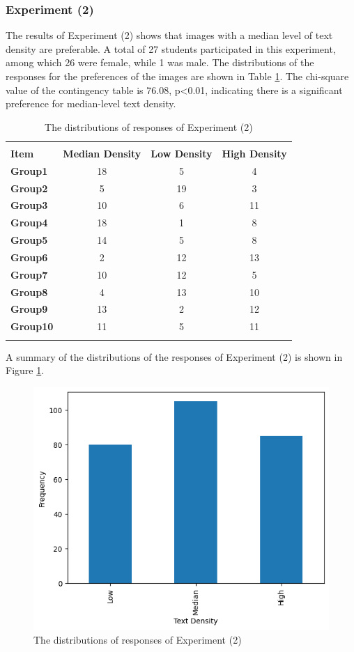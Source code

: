 \documentclass[a4paper]{article}
\begin{document}
\subsubsection{Experiment (2)}
The results of Experiment (2) shows that images with a median level of text density are preferable. A total of 27 students participated in this experiment, among which 26 were female, while 1 was male. The distributions of the responses for the preferences of the images are shown in Table \ref{tab: DistExperiment4}. The chi-square value of the contingency table is 76.08, p<0.01, indicating there is a significant preference for median-level text density. 


\begin{table}
\caption{The distributions of responses of Experiment (2)}
\label{tab: DistExperiment4}
\centering

\begin{tabular}{lccc} 
 \hline \\ [-1.8ex]
\textbf{Item} & \textbf{Median Density} & \textbf{Low Density} & \textbf{High Density} \\
\hline
\textbf{Group1} & 18 & 5 & 4 \\
\textbf{Group2} & 5 & 19 & 3 \\
\textbf{Group3} & 10 & 6 & 11 \\
\textbf{Group4} & 18 & 1 & 8 \\
\textbf{Group5} & 14 & 5 & 8 \\
\textbf{Group6} & 2 & 12 & 13 \\
\textbf{Group7} & 10 & 12 & 5 \\
\textbf{Group8} & 4 & 13 & 10 \\
\textbf{Group9} & 13 & 2 & 12 \\
\textbf{Group10} & 11 & 5 & 11 \\
\hline \\[-1.8ex]
\end{tabular}

\end{table}
A summary of the distributions of the responses of Experiment (2) is shown in Figure \ref{fig:DistExperiment4}.

\begin{figure}
    \centering
    \includegraphics[width=0.75\linewidth]{distexperiment4.png}
    \caption{The distributions of responses of Experiment (2)}
    \label{fig:DistExperiment4}
\end{figure}
\end{document}
